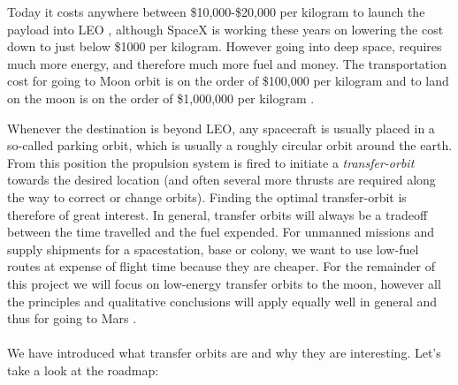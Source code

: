 Today it costs anywhere between \$10,000-\$20,000 per kilogram to launch the payload into LEO \cite{leo-cost}, although SpaceX is working these years on lowering the cost down to just below \$1000 per kilogram. However going into deep space, requires much more energy, and therefore much more fuel and money. The transportation cost for going to Moon orbit is on the order of \$100,000 per kilogram and to land on the moon is on the order of \$1,000,000 per kilogram \cite{astrobotic}\cite{Okada2015}.

Whenever the destination is beyond LEO, any spacecraft is usually placed in a so-called parking orbit, which is usually a roughly circular orbit around the earth. From this position the propulsion system is fired to initiate a \emph{transfer-orbit} towards the desired location (and often several more thrusts are required along the way to correct or change orbits). Finding the optimal transfer-orbit is therefore of great interest. In general, transfer orbits will always be a tradeoff between the time travelled and the fuel expended. For unmanned missions and supply shipments for a spacestation, base or colony, we want to use low-fuel routes at expense of flight time because they are cheaper. For the remainder of this project we will focus on low-energy transfer orbits to the moon, however all the principles and qualitative conclusions will apply equally well in general and thus for going to Mars \cite{Topputo2014}.\\
\\
We have introduced what transfer orbits are and why they are interesting. Let's take a look at the roadmap:
